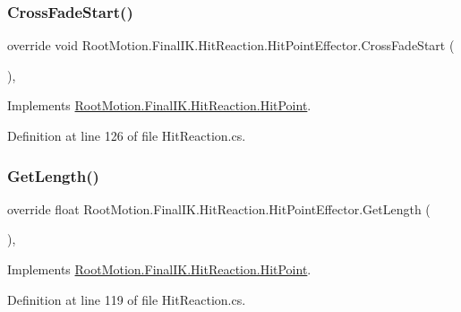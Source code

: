 \subsubsection{\texorpdfstring{Cross\+Fade\+Start()}{CrossFadeStart()}}
{\footnotesize\ttfamily override void Root\+Motion.\+Final\+I\+K.\+Hit\+Reaction.\+Hit\+Point\+Effector.\+Cross\+Fade\+Start (\begin{DoxyParamCaption}{ }\end{DoxyParamCaption})\hspace{0.3cm}{\ttfamily [protected]}, {\ttfamily [virtual]}}



Implements \mbox{\hyperlink{class_root_motion_1_1_final_i_k_1_1_hit_reaction_1_1_hit_point_a56804073dd02e8bf4988b1cb9f7bfaa7}{Root\+Motion.\+Final\+I\+K.\+Hit\+Reaction.\+Hit\+Point}}.



Definition at line 126 of file Hit\+Reaction.\+cs.

\mbox{\label{class_root_motion_1_1_final_i_k_1_1_hit_reaction_1_1_hit_point_effector_a704a13bf68058020ef0e636f70002629}} 
\subsubsection{\texorpdfstring{Get\+Length()}{GetLength()}}
{\footnotesize\ttfamily override float Root\+Motion.\+Final\+I\+K.\+Hit\+Reaction.\+Hit\+Point\+Effector.\+Get\+Length (\begin{DoxyParamCaption}{ }\end{DoxyParamCaption})\hspace{0.3cm}{\ttfamily [protected]}, {\ttfamily [virtual]}}



Implements \mbox{\hyperlink{class_root_motion_1_1_final_i_k_1_1_hit_reaction_1_1_hit_point_a0d4fe08e2d170bf5c994c5387cd6823c}{Root\+Motion.\+Final\+I\+K.\+Hit\+Reaction.\+Hit\+Point}}.



Definition at line 119 of file Hit\+Reaction.\+cs.

